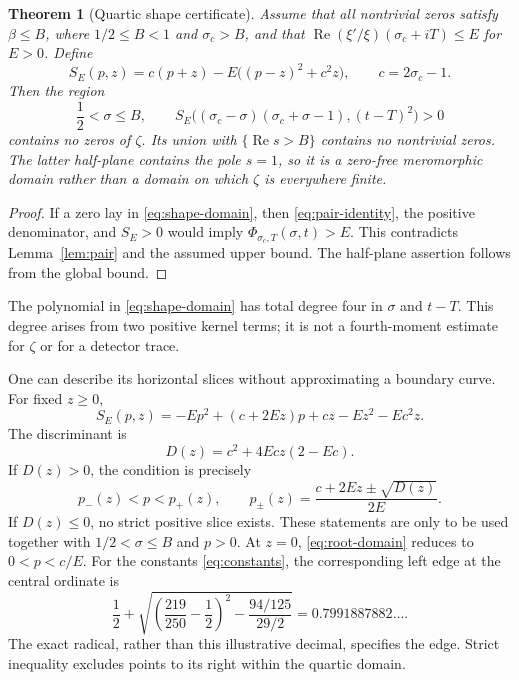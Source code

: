 \documentclass[11pt,a4paper]{article}
\newtheorem{theorem}{Theorem}[section]
\theoremstyle{definition}
\newcommand{\Rea}{\operatorname{Re}}
\begin{document}
\begin{theorem}[Quartic shape certificate]\label{thm:quartic}
Assume that all nontrivial zeros satisfy $\beta\le B$, where
$1/2\le B<1$ and $\sigma_c>B$, and that
$\Rea(\xi'/\xi)(\sigma_c+iT)\le E$ for $E>0$. Define
\begin{equation}\label{eq:surplus}
 S_E(p,z)=c(p+z)-E\bigl((p-z)^2+c^2z\bigr),
 \qquad c=2\sigma_c-1.
\end{equation}
Then the region
\begin{equation}\label{eq:shape-domain}
 \frac12<\sigma\le B,\qquad
 S_E\bigl((\sigma_c-\sigma)(\sigma_c+\sigma-1),(t-T)^2\bigr)>0
\end{equation}
contains no zeros of $\zeta$. Its union with $\{\Rea s>B\}$
contains no nontrivial zeros. The latter half-plane contains the pole
$s=1$, so it is a zero-free meromorphic domain rather than a domain
on which $\zeta$ is everywhere finite.
\end{theorem}

\begin{proof}
If a zero lay in \eqref{eq:shape-domain}, then
\eqref{eq:pair-identity}, the positive denominator, and $S_E>0$
would imply $\Phi_{\sigma_c,T}(\sigma,t)>E$.
This contradicts Lemma~\ref{lem:pair} and the assumed upper bound.
The half-plane assertion follows from the global bound.
\end{proof}

The polynomial in \eqref{eq:shape-domain} has total degree four in
$\sigma$ and $t-T$. This degree arises from two positive kernel
terms; it is not a fourth-moment estimate for $\zeta$ or for a
detector trace.

One can describe its horizontal slices without approximating a
boundary curve. For fixed $z\ge0$,
\[
 S_E(p,z)=-Ep^2+(c+2Ez)p+cz-Ez^2-Ec^2z.
\]
The discriminant is
\begin{equation}\label{eq:disc}
 D(z)=c^2+4Ecz(2-Ec).
\end{equation}
If $D(z)>0$, the condition is precisely
\begin{equation}\label{eq:root-domain}
 p_-(z)<p<p_+(z),\qquad
 p_\pm(z)=\frac{c+2Ez\pm\sqrt{D(z)}}{2E}.
\end{equation}
If $D(z)\le0$, no strict positive slice exists. These statements are
only to be used together with $1/2<\sigma\le B$ and $p>0$.
At $z=0$, \eqref{eq:root-domain} reduces to $0<p<c/E$.
For the constants \eqref{eq:constants}, the corresponding left edge
at the central ordinate is
\begin{equation}\label{eq:center-edge}
 \frac12+\sqrt{\left(\frac{219}{250}-\frac12\right)^2
                       -\frac{94/125}{29/2}}
 =0.7991887882\ldots.
\end{equation}
The exact radical, rather than this illustrative decimal, specifies
the edge. Strict inequality excludes points to its right within the
quartic domain.
\end{document}
